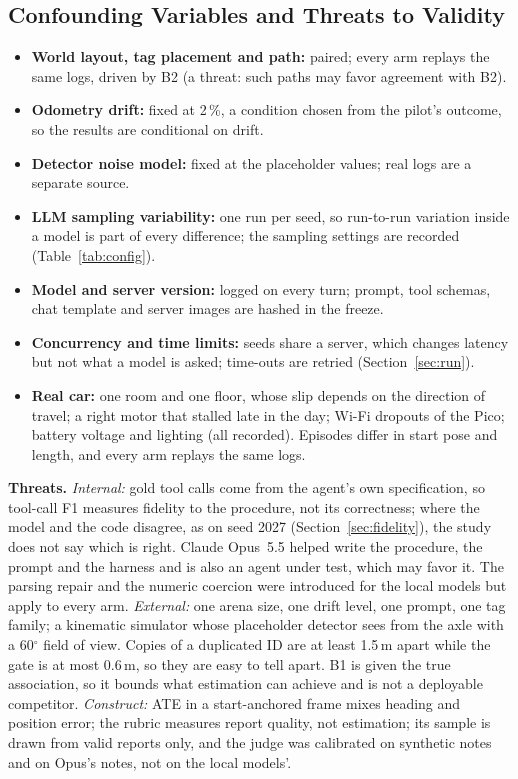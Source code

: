 \documentclass[conference]{IEEEtran}
\begin{document}
\subsection{Confounding Variables and Threats to Validity}\label{sec:confounders}
\begin{itemize}
\item \textbf{World layout, tag placement and path:} paired; every arm replays the same logs, driven by B2
(a threat: such paths may favor agreement with B2).
\item \textbf{Odometry drift:} fixed at 2\,\%, a condition chosen from the pilot's outcome, so the
results are conditional on drift.
\item \textbf{Detector noise model:} fixed at the placeholder values; real logs are a separate source.
\item \textbf{LLM sampling variability:} one run per seed, so run-to-run variation inside a model is part of
every difference; the sampling settings are recorded (Table~\ref{tab:config}).
\item \textbf{Model and server version:} logged on every turn; prompt, tool schemas, chat template and server
images are hashed in the freeze.
\item \textbf{Concurrency and time limits:} seeds share a server, which changes latency but not what a model
is asked; time-outs are retried (Section~\ref{sec:run}).
\item \textbf{Real car:} one room and one floor, whose slip depends on the direction of travel; a right motor
that stalled late in the day; Wi-Fi dropouts of the Pico; battery voltage and lighting (all recorded). Episodes
differ in start pose and length, and every arm replays the same logs.
\end{itemize}
\textbf{Threats.} \emph{Internal:} gold tool calls come from the agent's own specification, so tool-call F1
measures fidelity to the procedure, not its correctness; where the model and the code disagree, as on seed
2027 (Section~\ref{sec:fidelity}), the study does not say which is right. Claude Opus~5.5 helped write the procedure, the
prompt and the harness and is also an agent under test, which may favor it. The parsing repair and the numeric
coercion were introduced for the local models but apply to every arm.
\emph{External:} one arena size, one drift level, one prompt, one tag family; a kinematic simulator whose
placeholder detector sees from the axle with a 60$^\circ$ field of view. Copies of a duplicated ID are at least 1.5\,m apart while the gate is at most 0.6\,m, so they are easy
to tell apart. B1 is given the true association, so it bounds what estimation can achieve and is not
a deployable competitor.
\emph{Construct:} ATE in a start-anchored frame mixes heading and position error; the rubric measures report
quality, not estimation; its sample is drawn from valid reports only, and the judge was calibrated on
synthetic notes and on Opus's notes, not on the local models'.
\end{document}
